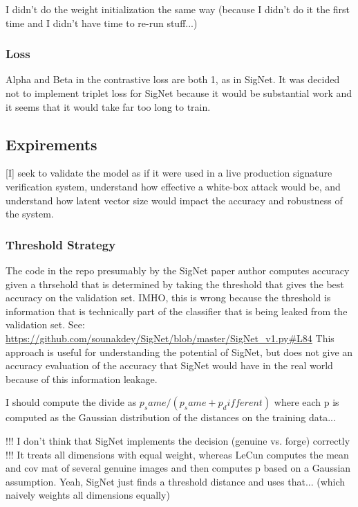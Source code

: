 I didn't do the weight initialization the same way (because I didn't do it the first time and I didn't have time to re-run stuff...)

\subsubsection{Loss}
Alpha and Beta in the contrastive loss are both 1, as in SigNet\cite{GitHub_sounakdey}.
It was decided not to implement triplet loss for SigNet because it would be substantial work and it seems that it would take far too long to train.


\subsection{Expirements}

[I] seek to validate the model as if it were used in a live production signature verification system, understand how effective a white-box attack would be, and understand how latent vector size would impact the accuracy and robustness of the system.

\subsubsection{Threshold Strategy}
The code in the repo presumably by the SigNet paper author computes accuracy given a thrsehold that is determined by taking the threshold that gives the best accuracy on the validation set.
IMHO, this is wrong because the threshold is information that is technically part of the classifier that is being leaked from the validation set.
See: \url{https://github.com/sounakdey/SigNet/blob/master/SigNet_v1.py#L84}
This approach is useful for understanding the potential of SigNet, but does not give an accuracy evaluation of the accuracy that SigNet would have in the real world because of this information leakage.


I should compute the divide as $p_same / (p_same + p_different)$ where each p is computed as the Gaussian distribution of the distances on the training data...

!!! I don't think that SigNet implements the decision (genuine vs. forge) correctly !!!
It treats all dimensions with equal weight, whereas LeCun computes the mean and cov mat of several genuine images and then computes p based on a Gaussian assumption.
Yeah, SigNet just finds a threshold distance and uses that... (which naively weights all dimensions equally)

